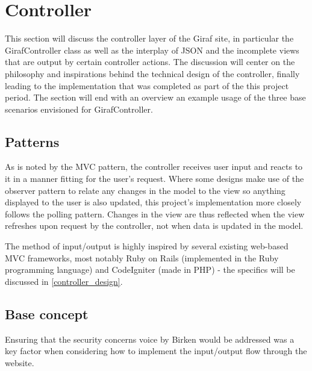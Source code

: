 \section{Controller}
\label{controller}
This section will discuss the controller layer of the Giraf site, in particular the GirafController class as well as the interplay of JSON and the incomplete views that are output by certain controller actions. The discussion will center on the philosophy and inspirations behind the technical design of the controller, finally leading to the implementation that was completed as part of the this project period. The section will end with an overview an example usage of the three base scenarios envisioned for GirafController.

\subsection{Patterns}
As is noted by the MVC pattern, the controller receives user input and reacts to it in a manner fitting for the user's request. Where some designs make use of the observer pattern to relate any changes in the model to the view so anything displayed to the user is also updated, this project's implementation more closely follows the polling pattern. Changes in the view are thus reflected when the view refreshes upon request by the controller, not when data is updated in the model.

The method of input/output is highly inspired by several existing web-based MVC frameworks, most notably Ruby on Rails (implemented in the Ruby programming language) and CodeIgniter (made in PHP) - the specifics will be discussed in \vref{controller_design}.

\subsection{Base concept}
Ensuring that the security concerns voice by Birken  would be addressed was a key factor when considering how to implement the input/output flow through the website. 

